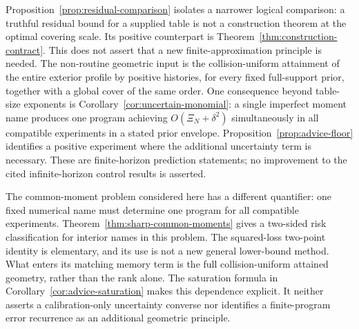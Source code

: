 \documentclass[11pt]{amsart}
\theoremstyle{definition}\newtheorem{definition}[theorem]{Definition}
\theoremstyle{remark}\newtheorem{remark}[theorem]{Remark}
\begin{document}
Proposition~\ref{prop:residual-comparison} isolates a narrower logical
comparison: a truthful residual bound for a supplied table is not a
construction theorem at the optimal covering scale. Its positive
counterpart is Theorem~\ref{thm:construction-contract}. This does not
assert that a new finite-approximation principle is needed. The
non-routine geometric input is the collision-uniform attainment of the
entire exterior profile by positive histories, for every fixed
full-support prior, together with a global cover of the same order.
One consequence beyond table-size exponents is
Corollary~\ref{cor:uncertain-monomial}: a single imperfect moment name
produces one program achieving $O(\Xi_N+\delta^2)$ simultaneously in
all compatible experiments in a stated prior envelope.
Proposition~\ref{prop:advice-floor} identifies a positive experiment
where the additional uncertainty term is necessary. These are
finite-horizon prediction statements; no improvement to the cited
infinite-horizon control results is asserted.


The common-moment problem considered here has a different quantifier:
one fixed numerical name must determine one program for all compatible
experiments. Theorem~\ref{thm:sharp-common-moments} gives a two-sided
risk classification for interior names in this problem. The squared-loss
two-point identity is elementary, and its use is not a new general
lower-bound method. What enters its matching memory term is the full
collision-uniform attained geometry, rather than the rank alone.
The saturation formula in Corollary~\ref{cor:advice-saturation} makes
this dependence explicit. It neither asserts a calibration-only
uncertainty converse nor identifies a finite-program error recurrence
as an additional geometric principle.
\end{document}
